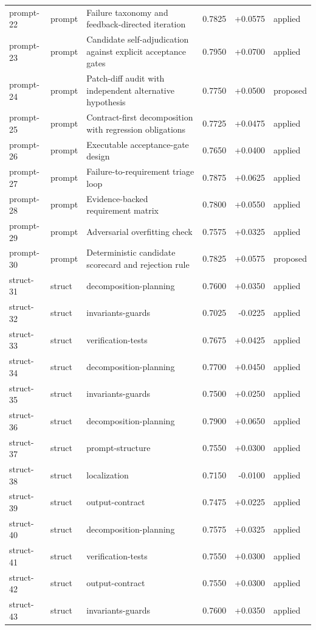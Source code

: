 \begin{center}
\begin{longtable}{llp{5.2cm}rrl}
prompt-22 & prompt & Failure taxonomy and feedback-directed iteration & 0.7825 & +0.0575 & applied \\
prompt-23 & prompt & Candidate self-adjudication against explicit acceptance gates & 0.7950 & +0.0700 & applied \\
prompt-24 & prompt & Patch-diff audit with independent alternative hypothesis & 0.7750 & +0.0500 & proposed \\
prompt-25 & prompt & Contract-first decomposition with regression obligations & 0.7725 & +0.0475 & applied \\
prompt-26 & prompt & Executable acceptance-gate design & 0.7650 & +0.0400 & applied \\
prompt-27 & prompt & Failure-to-requirement triage loop & 0.7875 & +0.0625 & applied \\
prompt-28 & prompt & Evidence-backed requirement matrix & 0.7800 & +0.0550 & applied \\
prompt-29 & prompt & Adversarial overfitting check & 0.7575 & +0.0325 & applied \\
prompt-30 & prompt & Deterministic candidate scorecard and rejection rule & 0.7825 & +0.0575 & proposed \\
struct-31 & struct & decomposition-planning & 0.7600 & +0.0350 & applied \\
struct-32 & struct & invariants-guards & 0.7025 & -0.0225 & applied \\
struct-33 & struct & verification-tests & 0.7675 & +0.0425 & applied \\
struct-34 & struct & decomposition-planning & 0.7700 & +0.0450 & applied \\
struct-35 & struct & invariants-guards & 0.7500 & +0.0250 & applied \\
struct-36 & struct & decomposition-planning & 0.7900 & +0.0650 & applied \\
struct-37 & struct & prompt-structure & 0.7550 & +0.0300 & applied \\
struct-38 & struct & localization & 0.7150 & -0.0100 & applied \\
struct-39 & struct & output-contract & 0.7475 & +0.0225 & applied \\
struct-40 & struct & decomposition-planning & 0.7575 & +0.0325 & applied \\
struct-41 & struct & verification-tests & 0.7550 & +0.0300 & applied \\
struct-42 & struct & output-contract & 0.7550 & +0.0300 & applied \\
struct-43 & struct & invariants-guards & 0.7600 & +0.0350 & applied \\

\end{longtable}
\end{center}
